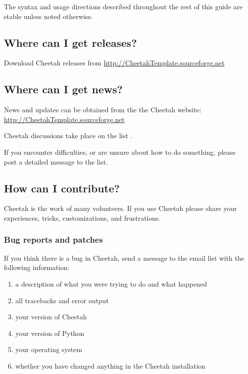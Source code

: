 The syntax and usage directions described throughout the rest of this guide are
stable unless noted otherwise.

\subsection{Where can I get releases?}
\label{intro.releases}

Download Cheetah releases from
\url{http://CheetahTemplate.sourceforge.net}

\subsection{Where can I get news?}
\label{intro.news}

News and updates can be obtained from the the Cheetah website:
\url{http://CheetahTemplate.sourceforge.net}

Cheetah discussions take place on the list
.

If you encounter difficulties, or are unsure about how to do something,
please post a detailed message to the list.

\subsection{How can I contribute?}
\label{intro.contribute}

Cheetah is the work of many volunteers.  If you use Cheetah please share your
experiences, tricks, customizations, and frustrations.

\subsubsection{Bug reports and patches}

If you think there is a bug in Cheetah, send a message to the email list
with the following information:

\begin{enumerate}
\item a description of what you were trying to do and what happened
\item all tracebacks and error output
\item your version of Cheetah
\item your version of Python
\item your operating system
\item whether you have changed anything in the Cheetah installation
\end{enumerate}

